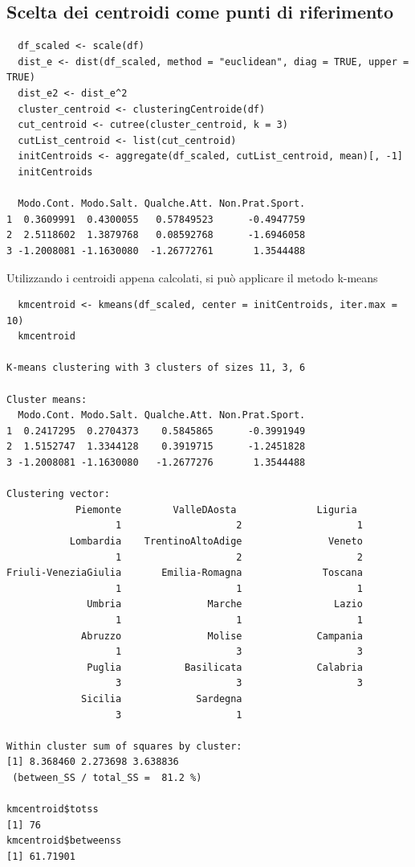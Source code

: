 \subsection{Scelta dei centroidi come punti di riferimento}\label{cap5.3.3}

\vspace{5mm}
\begin{lstlisting}
  df_scaled <- scale(df)
  dist_e <- dist(df_scaled, method = "euclidean", diag = TRUE, upper = TRUE)
  dist_e2 <- dist_e^2
  cluster_centroid <- clusteringCentroide(df)
  cut_centroid <- cutree(cluster_centroid, k = 3)
  cutList_centroid <- list(cut_centroid)
  initCentroids <- aggregate(df_scaled, cutList_centroid, mean)[, -1]
  initCentroids

  Modo.Cont. Modo.Salt. Qualche.Att. Non.Prat.Sport.
1  0.3609991  0.4300055   0.57849523      -0.4947759
2  2.5118602  1.3879768   0.08592768      -1.6946058
3 -1.2008081 -1.1630080  -1.26772761       1.3544488
\end{lstlisting}
\vspace{5mm}

Utilizzando i centroidi appena calcolati, si può applicare il metodo k-means

\vspace{5mm}
\begin{lstlisting}
  kmcentroid <- kmeans(df_scaled, center = initCentroids, iter.max = 10)
  kmcentroid

K-means clustering with 3 clusters of sizes 11, 3, 6

Cluster means:
  Modo.Cont. Modo.Salt. Qualche.Att. Non.Prat.Sport.
1  0.2417295  0.2704373    0.5845865      -0.3991949
2  1.5152747  1.3344128    0.3919715      -1.2451828
3 -1.2008081 -1.1630080   -1.2677276       1.3544488

Clustering vector:
            Piemonte         ValleDAosta              Liguria 
                   1                    2                    1 
           Lombardia    TrentinoAltoAdige               Veneto 
                   1                    2                    2 
Friuli-VeneziaGiulia       Emilia-Romagna              Toscana 
                   1                    1                    1 
              Umbria               Marche                Lazio 
                   1                    1                    1 
             Abruzzo               Molise             Campania 
                   1                    3                    3 
              Puglia           Basilicata             Calabria 
                   3                    3                    3 
             Sicilia             Sardegna 
                   3                    1 

Within cluster sum of squares by cluster:
[1] 8.368460 2.273698 3.638836
 (between_SS / total_SS =  81.2 %)

kmcentroid$totss
[1] 76
kmcentroid$betweenss
[1] 61.71901
\end{lstlisting}
\vspace{5mm}

